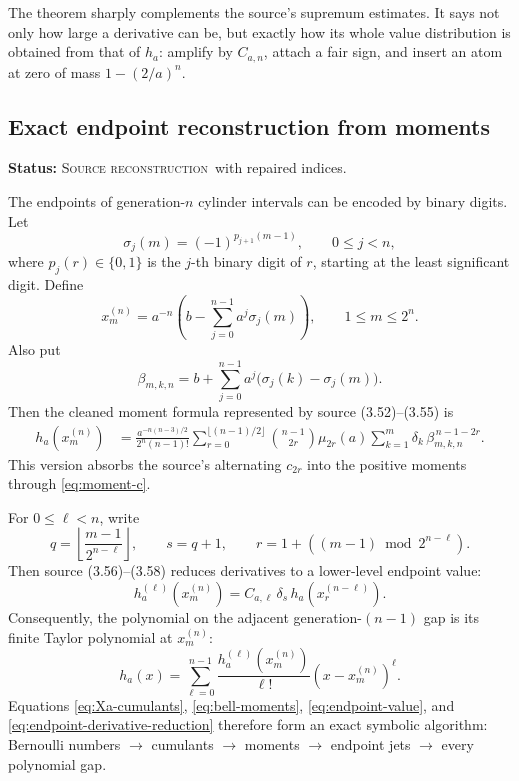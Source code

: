 \documentclass[11pt,oneside]{article}
\theoremstyle{definition}
\theoremstyle{remark}
\newcommand{\SourceStatus}{\textcolor{SourceBlue}{\textsc{Source reconstruction}}}
\newcommand{\status}[1]{\par\smallskip\noindent\textbf{Status:} #1.\par\smallskip}
\begin{document}
The theorem sharply complements the source's supremum estimates.  It says not only how large a derivative can be, but exactly how its whole value distribution is obtained from that of \(h_a\): amplify by \(C_{a,n}\), attach a fair sign, and insert an atom at zero of mass \(1-(2/a)^n\).

\subsection{Exact endpoint reconstruction from moments}
\status{\SourceStatus\ with repaired indices}

The endpoints of generation-\(n\) cylinder intervals can be encoded by binary digits.  Let
\begin{equation}
  \sigma_j(m)=(-1)^{p_{j+1}(m-1)},
  \qquad 0\le j<n,
  \label{eq:sigma-bits}
\end{equation}
where \(p_j(r)\in\{0,1\}\) is the \(j\)-th binary digit of \(r\), starting at the least significant digit.  Define
\begin{equation}
  x_m^{(n)}=a^{-n}\left(b-\sum_{j=0}^{n-1}a^j\sigma_j(m)\right),
  \qquad 1\le m\le2^n.
  \label{eq:xmn}
\end{equation}
Also put
\begin{equation}
  \beta_{m,k,n}=b+\sum_{j=0}^{n-1}a^j
   \bigl(\sigma_j(k)-\sigma_j(m)\bigr).
  \label{eq:beta-mkn}
\end{equation}
Then the cleaned moment formula represented by source (3.52)--(3.55) is
\begin{align}
 h_a(x_m^{(n)})
 &=\frac{a^{-n(n-3)/2}}{2^n(n-1)!}
 \sum_{r=0}^{\lfloor(n-1)/2\rfloor}
   \binom{n-1}{2r}\mu_{2r}(a)
   \sum_{k=1}^{m}\delta_k\,
      \beta_{m,k,n}^{\,n-1-2r}.
 \label{eq:endpoint-value}
\end{align}
This version absorbs the source's alternating \(c_{2r}\) into the positive moments through \eqref{eq:moment-c}.

For \(0\le\ell<n\), write
\begin{equation}
  q=\left\lfloor\frac{m-1}{2^{n-\ell}}\right\rfloor,
  \qquad s=q+1,
  \qquad r=1+((m-1)\bmod 2^{n-\ell}).
  \label{eq:endpoint-index-reduction}
\end{equation}
Then source (3.56)--(3.58) reduces derivatives to a lower-level endpoint value:
\begin{equation}
  h_a^{(\ell)}(x_m^{(n)})
   =C_{a,\ell}\,\delta_s\,h_a(x_r^{(n-\ell)}).
  \label{eq:endpoint-derivative-reduction}
\end{equation}
Consequently, the polynomial on the adjacent generation-\((n-1)\) gap is its finite Taylor polynomial at \(x_m^{(n)}\):
\begin{equation}
  h_a(x)=\sum_{\ell=0}^{n-1}
   \frac{h_a^{(\ell)}(x_m^{(n)})}{\ell!}
   (x-x_m^{(n)})^\ell.
  \label{eq:gap-taylor-polynomial}
\end{equation}
Equations \eqref{eq:Xa-cumulants}, \eqref{eq:bell-moments}, \eqref{eq:endpoint-value}, and \eqref{eq:endpoint-derivative-reduction} therefore form an exact symbolic algorithm: Bernoulli numbers \(\to\) cumulants \(\to\) moments \(\to\) endpoint jets \(\to\) every polynomial gap.
\end{document}
